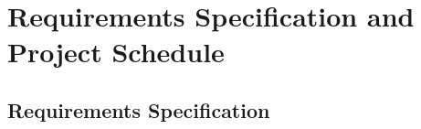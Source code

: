 \chapter{Requirements Specification and Project Schedule}
\clearpage

\section{Requirements Specification} \label{Requirements Specification}
\enlargethispage{2.5cm}
\begin{adjustwidth}{0.23cm}{0cm} \hfuzz=7.0pt \vfuzz=19.0pt
\end{adjustwidth}
\newpage

